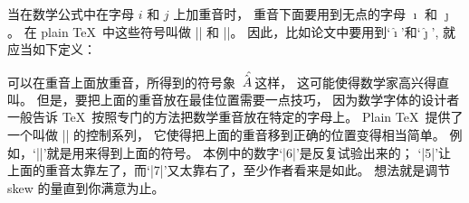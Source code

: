 \danger 当在数学公式中在字母 $i$ 和 $j$ 上加重音时，
重音下面要用到无点的字母 $\imath$ 和 $\jmath$。%
在 plain \TeX\ 中这些符号叫做 |\imath| 和 |\jmath|。%
因此，比如论文中要用到`$\hat\imath$'和`$\hat\jmath$', 就应当如下定义：
\begintt
\def\ihat{{\hat\imath}}
\def\jhat{{\hat\jmath}}
\endtt

\def\Ahat{{\hat A}}
\danger 可以在重音上面放重音，所得到的符号象 $\skew6\hat\Ahat$ 这样，
这可能使得数学家高兴得直叫。%
但是，要把上面的重音放在最佳位置需要一点技巧，
因为数学字体的设计者一般告诉 \TeX\ 按照专门的方法把数学重音放在特定的字母上。%
Plain \TeX\ 提供了一个叫做 |\skew| 的控制系列，
它使得把上面的重音移到正确的位置变得相当简单。%
例如，`|\hat\Ahat|'就是用来得到上面的符号。%
本例中的数字`|6|'是反复试验出来的；
`|5|'让上面的重音太靠左了，而`|7|'又太靠右了，至少作者看来是如此。%
想法就是调节 skew 的量直到你满意为止。

